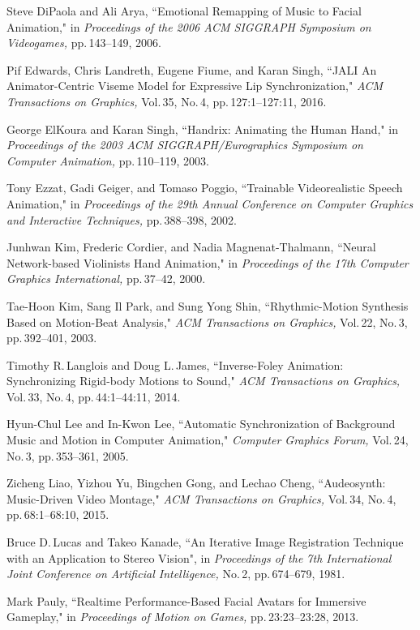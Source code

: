 \begin{thebibliography}{55}
Steve DiPaola and Ali Arya,
 ``Emotional Remapping of Music to Facial Animation,"
 in \textit{Proceedings of the 2006 ACM SIGGRAPH Symposium on Videogames,} pp.\,143--149, 2006.
 
Pif Edwards, Chris Landreth, Eugene Fiume, and Karan Singh,
 ``JALI An Animator-Centric Viseme Model for Expressive Lip Synchronization,"
 \textit{ACM Transactions on Graphics,} Vol.\,35, No.\,4, pp.\,127:1--127:11, 2016.

George ElKoura and Karan Singh,
 ``Handrix: Animating the Human Hand,"
 in \textit{Proceedings of the 2003 ACM SIGGRAPH/Eurographics Symposium on Computer Animation,} pp.\,110--119, 2003.

Tony Ezzat, Gadi Geiger, and Tomaso Poggio,
 ``Trainable Videorealistic Speech Animation,"
 in \textit{Proceedings of the 29th Annual Conference on Computer Graphics and Interactive Techniques,} pp.\,388--398, 2002.

Junhwan Kim, Frederic Cordier, and Nadia Magnenat-Thalmann,
 ``Neural Network-based Violinists Hand Animation,"
 in \textit{Proceedings of the 17th Computer Graphics International,} pp.\,37--42, 2000.

Tae-Hoon Kim, Sang Il Park, and Sung Yong Shin,
 ``Rhythmic-Motion Synthesis Based on Motion-Beat Analysis,"
 \textit{ACM Transactions on Graphics,} Vol.\,22, No.\,3, pp.\,392--401, 2003.

Timothy R.\,Langlois and Doug L.\,James,
 ``Inverse-Foley Animation: Synchronizing Rigid-body Motions to Sound,"
 \textit{ACM Transactions on Graphics,} Vol.\,33, No.\,4, pp.\,44:1--44:11, 2014.

Hyun-Chul Lee and In-Kwon Lee,
 ``Automatic Synchronization of Background Music and Motion in Computer Animation,"
 \textit{Computer Graphics Forum,} Vol.\,24, No.\,3, pp.\,353--361, 2005.

Zicheng Liao, Yizhou Yu, Bingchen Gong, and Lechao Cheng,
 ``Audeosynth: Music-Driven Video Montage,"
 \textit{ACM Transactions on Graphics,} Vol.\,34, No.\,4, pp.\,68:1--68:10, 2015.
 
Bruce D.\,Lucas and Takeo Kanade,
 ``An Iterative Image Registration Technique with an Application to Stereo Vision",
 in \textit{Proceedings of the 7th International Joint Conference on Artificial Intelligence,} No.\,2, pp.\,674--679, 1981.

Mark Pauly,
 ``Realtime Performance-Based Facial Avatars for Immersive Gameplay,"
 in \textit{Proceedings of Motion on Games,} pp.\,23:23--23:28, 2013.
 

\end{thebibliography}
